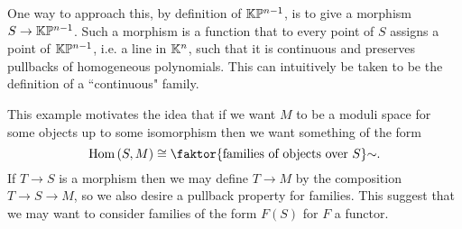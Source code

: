 One way to approach this, by definition of $\mathbb{K}\mathbb{P}^{n-1}$, is to give a morphism $S\to \mathbb{K}\mathbb{P}^{n-1}$. Such a morphism is a function that to every point of $S$ assigns a point of $\mathbb{K}\mathbb{P}^{n-1}$, i.e. a line in $\mathbb{K}^n$, such that it is continuous and preserves pullbacks of homogeneous polynomials. This can intuitively be taken to be the definition of a ``continuous" family.\bigskip

This example motivates the idea that if we want $M$ to be a moduli space for some objects up to some isomorphism then we want something of the form
\[\Hom(S,M)\cong\quot{\cpa{\text{families of objects over $S$}}}\sim.\]
If $T\to S$ is a morphism then we may define $T\to M$ by the composition $T\to S\to M$, so we also desire a pullback property for families. This suggest that we may want to consider families of the form $F(S)$ for $F$ a functor.